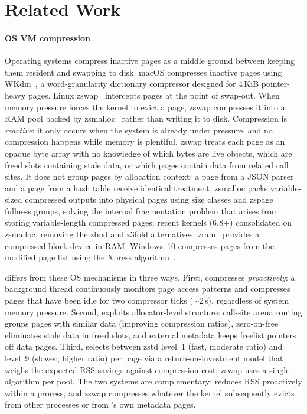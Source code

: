 \section{Related Work}
\label{sec:related}

\paragraph{OS VM compression}
Operating systems compress inactive pages as a middle ground between
keeping them resident and swapping to disk.  macOS compresses inactive
pages using WKdm~\cite{wilson1999case,apple2013compressed}, a
word-granularity dictionary compressor designed for 4\,KiB
pointer-heavy pages.
Linux zswap~\cite{jennings2013zswap} intercepts pages at the
point of swap-out.  When memory pressure forces the kernel to
evict a page, zswap compresses it into a RAM pool backed by
zsmalloc~\cite{zsmalloc2024} rather than writing it to disk.
Compression is \emph{reactive}: it only occurs when the system
is already under pressure, and no compression happens while
memory is plentiful.  zswap treats each page as an opaque byte
array with no knowledge of which bytes are live objects, which
are freed slots containing stale data, or which pages contain
data from related call sites.  It does not group pages by
allocation context: a page from a JSON parser and a page from
a hash table receive identical treatment.  zsmalloc packs
variable-sized compressed outputs into physical pages using
size classes and zspage fullness groups, solving the internal
fragmentation problem that arises from storing variable-length
compressed pages; recent kernels (6.8+) consolidated on
zsmalloc, removing the zbud and z3fold alternatives.
zram~\cite{zram2024} provides a compressed block device in RAM\@.
Windows~10 compresses pages from the modified page list using the
Xpress algorithm~\cite{microsoft2015compression}.

\sys differs from these OS mechanisms in three ways.
First, \sys compresses \emph{proactively}: a background thread
continuously monitors page access patterns and compresses pages
that have been idle for two compressor ticks ($\sim$2\,s),
regardless of system memory pressure.  Second, \sys exploits
allocator-level structure: call-site arena routing groups pages
with similar data (improving compression ratios), zero-on-free
eliminates stale data in freed slots, and external metadata keeps
freelist pointers off data pages.  Third, \sys selects between
zstd level~1 (fast, moderate ratio) and level~9 (slower, higher
ratio) per page via a return-on-investment model that weighs the
expected RSS savings against compression cost; zswap uses a single
algorithm per pool.
The two systems are complementary: \sys reduces RSS proactively
within a process, and zswap compresses whatever the kernel
subsequently evicts from other processes or from \sys's own
metadata pages.

